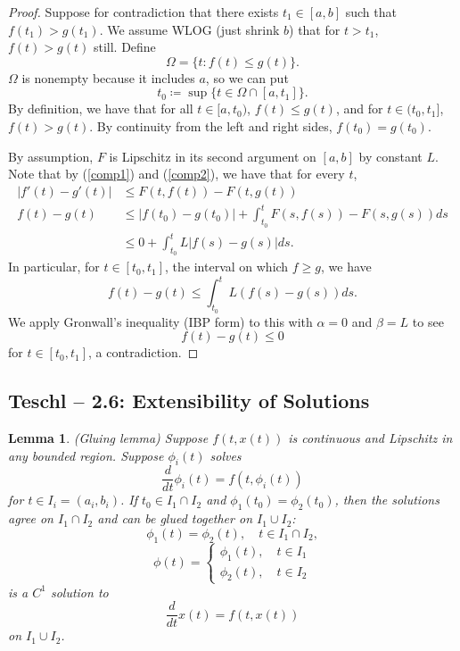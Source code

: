 \documentclass{tufte-handout}
\newtheorem{lemma}[thm]{Lemma}
\theoremstyle{definition}
\begin{document}
\begin{proof}
	Suppose for contradiction that there exists $t_1 \in [a,b]$ such that $f(t_1) > g(t_1)$. We assume WLOG (just shrink $b$) that for $t > t_1$, $f(t) > g(t)$ still. Define \[
		\Omega = \{t: f(t) \le g(t)\}
	.\] $\Omega$ is nonempty because it includes $a$, so we can put \[
		t_0 \coloneqq \sup \{t \in \Omega \cap [a,t_1]\}
	.\] By definition, we have that for all $t \in [a,t_0)$, $f(t) \le g(t)$, and for $t \in (t_0, t_1]$, $f(t) > g(t)$. By continuity from the left and right sides, $f(t_0) = g(t_0)$. 

	By assumption, $F$ is Lipschitz in its second argument on $[a,b]$ by constant $L$. Note that by (\ref{comp1}) and (\ref{comp2}), we have that for every $t$,
	\begin{align*}
		\left| f'(t) - g'(t) \right| &\le F(t,f(t)) - F(t,g(t)) \\
		f(t) - g(t) &\le \left| f(t_0) - g(t_0) \right| + \int_{t_0}^{t} F(s,f(s)) - F(s,g(s)) ds  \\
					&\le 0 + \int_{t_0}^{t} L \left| f(s)-g(s) \right|ds
	.\end{align*}
	In particular, for $t \in [t_0, t_1]$, the interval on which $f \ge g$, we have \[
		f(t) -g(t) \le \int_{t_0}^{t} L \left( f(s) - g(s) \right)ds 
	.\] We apply Gronwall's inequality (IBP form) to this with $\alpha = 0$ and $\beta = L$ to see \[
		f(t) -g(t) \le 0
	\] for $t \in [t_0,t_1]$, a contradiction.

\end{proof}

\subsection{Teschl -- 2.6: Extensibility of Solutions}
\begin{lemma}
	(Gluing lemma) Suppose $f(t,x(t))$ is continuous and Lipschitz in any bounded region. Suppose $\phi_i(t)$ solves \[
		\frac{d}{dt}\phi_i(t) = f(t,\phi_i(t))
	\] for $t \in I_i=(a_i,b_i)$. If $t_0 \in I_1 \cap I_2$ and $\phi_1(t_0) = \phi_2(t_0)$, then the solutions agree on $I_1 \cap I_2$ and can be glued together on $I_1 \cup I_2$: \[
		\phi_1(t) = \phi_2(t), \quad t \in I_1\cap I_2
	,\] \[
		\phi(t) = \begin{cases}
			\phi_1(t), \quad t \in I_1 \\
			\phi_2(t), \quad t \in I_2
		\end{cases}
	\] is a $C^1$ solution to \[
		\frac{d}{dt} x(t) = f(t,x(t))
	\] on $I_1 \cup I_2$.

\end{lemma}
\end{document}
